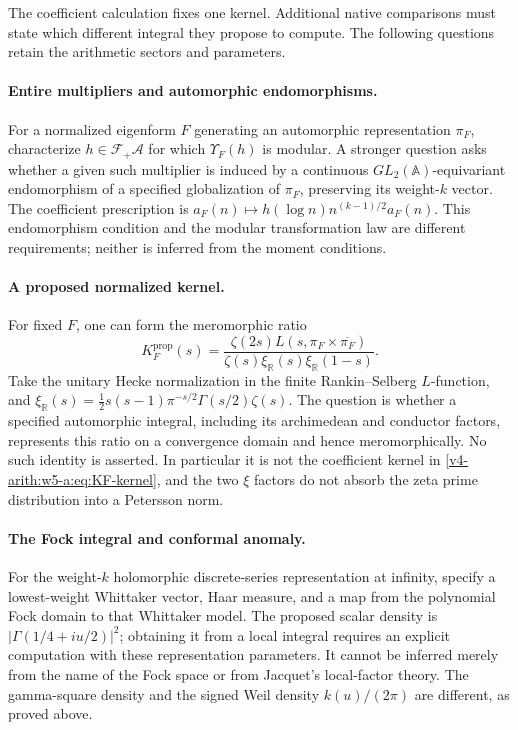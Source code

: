The coefficient calculation fixes one kernel. Additional native
comparisons must state which different integral they propose to compute.
The following questions retain the arithmetic sectors and parameters.

\paragraph{Entire multipliers and automorphic endomorphisms.}
\label{v4-arith:pres57:multiplier-question}
For a normalized eigenform $F$ generating an automorphic representation
$\pi_F$, characterize $h\in\mathcal F_+\mathscr A$ for which
$\Upsilon_F(h)$ is modular. A stronger question asks whether a given
such multiplier is induced by a continuous $GL_2(\mathbb A)$-equivariant
endomorphism of a specified globalization of $\pi_F$, preserving its
weight-$k$ vector. The coefficient prescription is
$a_F(n)\mapsto h(\log n)n^{(k-1)/2}a_F(n)$.
This endomorphism condition and the modular transformation law are
different requirements; neither is inferred from the moment conditions.

\paragraph{A proposed normalized kernel.}
\label{v4-arith:pres57:kernel-question}
For fixed $F$, one can form the meromorphic ratio
\[
 K_F^{\mathrm{prop}}(s)=
 \frac{\zeta(2s)L(s,\pi_F\times\overline{\pi_F})}
 {\zeta(s)\xi_{\mathbb R}(s)\xi_{\mathbb R}(1-s)}.
\]
Take the unitary Hecke normalization in the finite Rankin--Selberg
$L$-function, and $\xi_{\mathbb R}(s)=\frac12s(s-1)\pi^{-s/2}\Gamma(s/2)\zeta(s)$.
The question is whether a specified automorphic integral, including
its archimedean and conductor factors, represents this ratio on a
convergence domain and hence meromorphically. No such identity is
asserted. In particular it is not the coefficient kernel in
\eqref{v4-arith:w5-a:eq:KF-kernel}, and the two $\xi$ factors do not
absorb the zeta prime distribution into a Petersson norm.

\paragraph{The Fock integral and conformal anomaly.}
\label{v4-arith:pres57:arch-question}
For the weight-$k$ holomorphic discrete-series representation at
infinity, specify a lowest-weight Whittaker vector, Haar measure,
and a map from the polynomial Fock domain to that Whittaker model.
The proposed scalar density is $|\Gamma(1/4+iu/2)|^2$; obtaining it
from a local integral requires an explicit computation with these
representation parameters. It cannot be inferred merely from the
name of the Fock space or from Jacquet's local-factor theory.
The gamma-square density and the signed Weil density
$k(u)/(2\pi)$ are different, as proved above.

